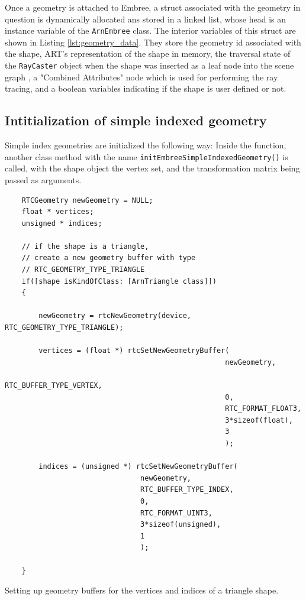 Once a geometry is attached to Embree, a  struct associated with the geometry in question is dynamically allocated ans stored in a linked list, whose head is an instance variable of the \texttt{ArnEmbree} class. The interior variables of this struct are shown in Listing \ref{lst:geometry_data}. They store the geometry id associated with the shape, ART's representation of the shape in memory, the traversal state of the \texttt{RayCaster} object when the shape was inserted as a leaf node into the scene graph , a "Combined Attributes" node which is used for performing the ray tracing, and a boolean variables indicating if the shape is user defined or not.


\subsection{Intitialization of simple indexed geometry}
Simple index geometries are initialized the following way: Inside the  function, another class method with the name \texttt{initEmbreeSimpleIndexedGeometry()} is called, with the shape object the vertex set, and the transformation matrix being passed as arguments. 

\begin{listing} 
	\begin{lstlisting}
	RTCGeometry newGeometry = NULL;
	float * vertices;
	unsigned * indices;
	
	// if the shape is a triangle, 
	// create a new geometry buffer with type
	// RTC_GEOMETRY_TYPE_TRIANGLE
	if([shape isKindOfClass: [ArnTriangle class]]) 
	{
	
		newGeometry = rtcNewGeometry(device, RTC_GEOMETRY_TYPE_TRIANGLE);
		
		vertices = (float *) rtcSetNewGeometryBuffer(
													newGeometry,
													RTC_BUFFER_TYPE_VERTEX,
													0,
													RTC_FORMAT_FLOAT3,
													3*sizeof(float),
													3
													);
		
		indices = (unsigned *) rtcSetNewGeometryBuffer(
		                        newGeometry,
		                        RTC_BUFFER_TYPE_INDEX,
		                        0,
		                        RTC_FORMAT_UINT3,
		                        3*sizeof(unsigned),
		                        1
		                        );
	
	}
	\end{lstlisting}
	\caption{Setting up geometry buffers for the vertices and indices of a triangle shape.}
	\label{lst:geometry_buffer}
\end{listing}

